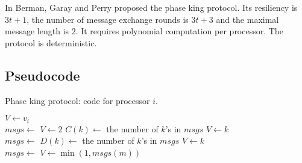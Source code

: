 In \cite{BGP89} Berman, Garay and Perry proposed the phase king protocol. Its resiliency is $3t+1$, the number of message exchange rounds is $3t+3$ and the maximal message length is $2$. It requires polynomial computation per processor. The protocol is deterministic.

\subsection{Pseudocode}
\begin{breakablealgorithm} \label{pk:code}
  \caption{Phase king protocol: code for processor $i$.}
  \begin{algorithmic}[1]
    \State $V \gets v_i$
        \State {} \label{pk:code:er0_broadcast}
        \\
        \State $msgs \gets$  \label{pk:code:er1_receive}
        \State $V \gets 2$
            \State $C(k) \gets$ the number of $k$'s in $msgs$
                \State $V \gets k$ \label{pk:code:er1_vgetsk}
            \EndIf
        \EndFor
        \State {} \label{pk:code:er1_broadcast}
        \\
        \State $msgs \gets$  \label{pk:code:er2_receive}
            \State $D(k) \gets$ the number of $k$'s in $msgs$
                \State $V \gets k$ \label{pk:code:er2_vgetsk}
            \EndIf
        \EndFor
            \State {} \label{pk:code:er2_broadcast}
        \EndIf
        \\
        \State $msgs \gets$  \label{pk:code:er3_receive}
         \label{pk:code:er3_if}
            \State $V \gets \min(1, msgs(m))$ \label{pk:code:er3_vgetsmin}
        \EndIf
    \EndFor
  \end{algorithmic}
\end{breakablealgorithm}



